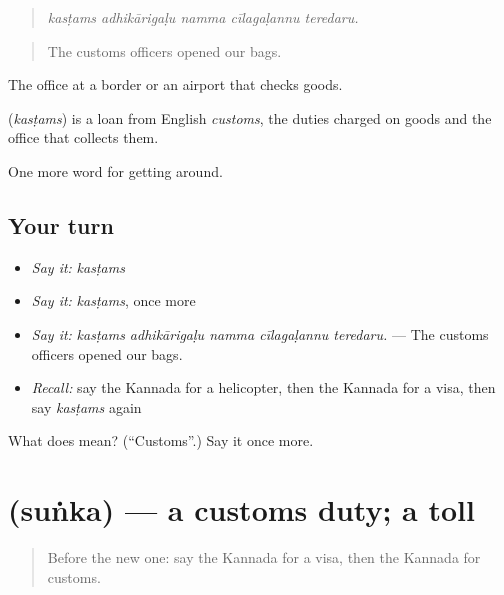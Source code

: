 \begin{quote}
\emph{kasṭams adhikārigaḷu namma cīlagaḷannu teredaru.}
\end{quote}

\begin{quote}
The customs officers opened our bags.
\end{quote}

The office at a border or an airport that checks goods.

\begin{cousinweb}
\textbf{} (\emph{kasṭams}) is a loan from English \emph{customs}, the duties charged on goods and the office that collects them.
\end{cousinweb}

\begin{grammarlens}[title={What you've built}]
One more word for getting around.
\end{grammarlens}

\subsection*{Your turn}
\begin{itemize}
\raggedright
  \item \emph{Say it:} \emph{kasṭams}
  \item \emph{Say it:} \emph{kasṭams}, once more
  \item \emph{Say it:} \emph{kasṭams adhikārigaḷu namma cīlagaḷannu teredaru.} — The customs officers opened our bags.
  \item \emph{Recall:} say the Kannada for a helicopter, then the Kannada for a visa, then say \emph{kasṭams} again
\end{itemize}

\begin{tcolorbox}[breakable,colback=teal!4,colframe=teal!35!black,title={Before you move on}]
What does  mean? (\textquotedblleft{}Customs\textquotedblright{}.) Say it once more.
\end{tcolorbox}
\section[\texorpdfstring{\kn{ಸುಂಕ} (suṅka)}{ಸುಂಕ (suṅka)}]{ (suṅka) — a customs duty; a toll}

\label{lesson:KA-C439-sunka}



\begin{quote}
Before the new one: say the Kannada for a visa, then the Kannada for customs.
\end{quote}

